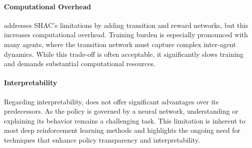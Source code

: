 \paragraph{Computational Overhead}
\fname{} addresses SHAC's limitations by adding transition and reward networks, but this increases computational overhead. Training burden is especially pronounced with many agents, where the transition network must capture complex inter-agent dynamics. While this trade-off is often acceptable, it significantly slows training and demands substantial computational resources.

\paragraph{Interpretability}
Regarding interpretability, \fname{} does not offer significant advantages over its predecessors. As the policy is governed by a neural network, understanding or explaining its behavior remains a challenging task. This limitation is inherent to most deep reinforcement learning methods and highlights the ongoing need for techniques that enhance policy transparency and interpretability.

